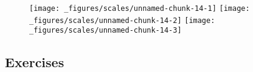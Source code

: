 \begin{Shaded}
\begin{Highlighting}[]
\StringTok{ }\NormalTok{(} \NormalTok{, } \NormalTok{:}\NormalTok{, } \NormalTok{:}\NormalTok{)}
\StringTok{ }\StringTok{ }\NormalTok{(}\NormalTok{(} 

\StringTok{ }\NormalTok{(} \NormalTok{(} \NormalTok{))}
\StringTok{ }\NormalTok{(} \NormalTok{(} \NormalTok{(}\NormalTok{, }\NormalTok{)))}
\end{Highlighting}
\end{Shaded}

\begin{figure}[H]
  \texttt{[image: \_figures/scales/unnamed-chunk-14-1]}%
  \texttt{[image: \_figures/scales/unnamed-chunk-14-2]}%
  \texttt{[image: \_figures/scales/unnamed-chunk-14-3]}
\end{figure}

\subsection{Exercises}

